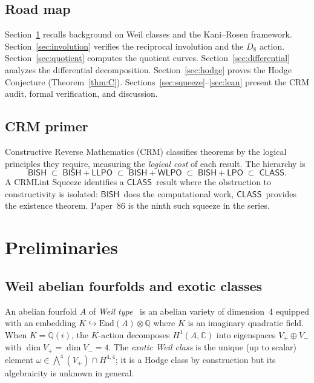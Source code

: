 \documentclass[11pt]{article}
\theoremstyle{plain}
\theoremstyle{definition}
\theoremstyle{remark}
\newcommand{\Q}{\mathbb{Q}}
\newcommand{\C}{\mathbb{C}}
\newcommand{\End}{\mathrm{End}}
\newcommand{\BISH}{\ensuremath{\mathsf{BISH}}}
\newcommand{\LPO}{\ensuremath{\mathsf{LPO}}}
\newcommand{\WLPO}{\ensuremath{\mathsf{WLPO}}}
\newcommand{\LLPO}{\ensuremath{\mathsf{LLPO}}}
\newcommand{\CLASS}{\ensuremath{\mathsf{CLASS}}}
\begin{document}
\subsection{Road map}

Section~\ref{sec:prelim} recalls background on Weil classes
and the Kani--Rosen framework.
Section~\ref{sec:involution} verifies the reciprocal involution and
the $D_8$ action.
Section~\ref{sec:quotient} computes the quotient curves.
Section~\ref{sec:differential} analyzes the differential decomposition.
Section~\ref{sec:hodge} proves the Hodge Conjecture (Theorem~\ref{thm:C}).
Sections~\ref{sec:squeeze}--\ref{sec:lean} present the CRM audit,
formal verification, and discussion.

\subsection{CRM primer}

Constructive Reverse Mathematics (CRM) classifies theorems by the
logical principles they require, measuring the \emph{logical cost}
of each result.  The hierarchy is
\[
  \BISH \;\subset\; \BISH{+}\LLPO \;\subset\; \BISH{+}\WLPO
  \;\subset\; \BISH{+}\LPO \;\subset\; \CLASS.
\]
A CRMLint Squeeze identifies a \CLASS\ result where the obstruction
to constructivity is isolated: \BISH\ does the computational work,
\CLASS\ provides the existence theorem.  Paper~86 is the ninth such
squeeze in the series.

\section{Preliminaries}
\label{sec:prelim}

\subsection{Weil abelian fourfolds and exotic classes}

An abelian fourfold $A$ of \emph{Weil type}~\cite{Mumford69} is an
abelian variety of dimension~4 equipped with an embedding
$K \hookrightarrow \End(A) \otimes \Q$ where $K$ is an imaginary
quadratic field.  When $K = \Q(i)$, the
$K$-action decomposes $H^1(A,\C)$ into eigenspaces $V_+ \oplus V_-$
with $\dim V_+ = \dim V_- = 4$.  The \emph{exotic Weil class} is the
unique (up to scalar) element $\omega \in \bigwedge^4(V_+) \cap H^{4,4}$;
it is a Hodge class by construction but its algebraicity is
unknown in general.
\end{document}
